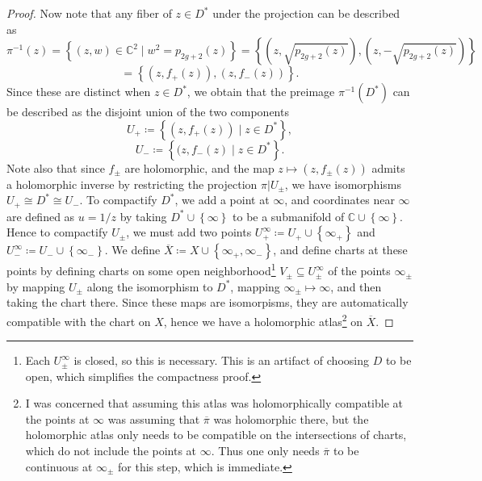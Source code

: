 \documentclass[11pt, letterpaper]{article}
\theoremstyle{plain}
\begin{document}
\begin{proof}
	Now note that any fiber of $z\in D^*$ under the projection can be described as
	\[
		\pi ^{-1} (z) = \left\{ (z,w)\in\mathbb{C} ^2\mid w^2 = p_{2g+2} (z) \right\} =\left\{ \left( z,\sqrt{p_{2g+2} (z)}  \right) ,\left( z,-\sqrt{p_{2g+2} (z)}  \right)  \right\} 
	\]
	\[
		=\left\{ \left( z,f_+(z) \right) ,\left( z,f_-(z) \right)  \right\} 
	.\]
	Since these are distinct when $z\in D^*$, we obtain that the preimage $\pi ^{-1} (D^*)$ can be described as the disjoint union of the two components
	\[
		U_+ \coloneqq \left\{ (z,f_+(z))\mid z\in D^* \right\} ,
	\]
	\[
		U_-\coloneqq \left\{ (z,f_-(z)\mid z\in D^* \right\} 
	.\]
	Note also that since $f_\pm$ are holomorphic, and the map $z\mapsto (z,f_\pm(z))$ admits a holomorphic inverse by restricting the projection $\pi|U_\pm$, we have isomorphisms $U_+ \cong D^* \cong U_-$. To compactify $D^*$, we add a point at $\infty $, and coordinates near $\infty $ are defined as $u=1/z$ by taking $D^* \cup \left\{ \infty  \right\} $ to be a submanifold of $\mathbb{C} \cup \left\{ \infty  \right\} $. Hence to compactify $U_\pm$, we must add two points $U_+^\infty \coloneqq U_+ \cup \left\{ \infty _+ \right\} $ and $U_-^\infty \coloneqq U_- \cup \left\{ \infty _- \right\} $. We define $\overline{X} \coloneqq X \cup \left\{ \infty _+,\infty _- \right\} $, and define charts at these points by defining charts on some open neighborhood\footnote{Each $U_\pm^\infty$ is closed, so this is necessary. This is an artifact of choosing $D$ to be open, which simplifies the compactness proof.} $V_\pm \subseteq U_\pm^\infty $ of the points $\infty_\pm$ by mapping $U_\pm$ along the isomorphism to $D^*$, mapping $\infty _\pm \mapsto \infty $, and then taking the chart there. Since these maps are isomorpisms, they are automatically compatible with the chart on $X$, hence we have a holomorphic atlas\footnote{I was concerned that assuming this atlas was holomorphically compatible at the points at $\infty $ was assuming that $\overline{\pi } $ was holomorphic there, but the holomorphic atlas only needs to be compatible on the intersections of charts, which do not include the points at $\infty $. Thus one only needs $\overline{\pi } $ to be continuous at $\infty _\pm$ for this step, which is immediate.} on $\overline{X} $.


\end{proof}
\end{document}
